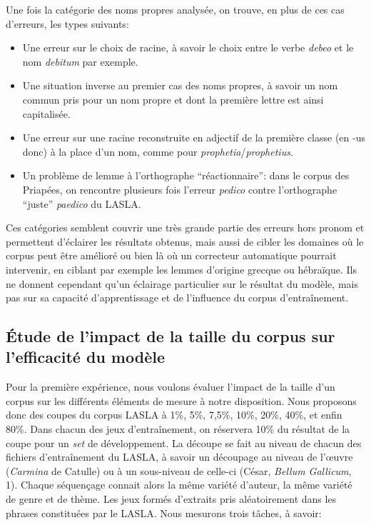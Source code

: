 Une fois la catégorie des noms propres analysée, on trouve, en plus de ces cas d'erreurs, les types suivants:
\begin{itemize}
    \item Une erreur sur le choix de racine, à savoir le choix entre le verbe \textit{debeo} et le nom \textit{debitum} par exemple.
    \item Une situation inverse au premier cas des noms propres, à savoir un nom commun pris pour un nom propre et dont la première lettre est ainsi capitalisée.
    \item Une erreur sur une racine reconstruite en adjectif de la première classe (en -us donc) à la place d'un nom, comme pour \textit{prophetia}/\textit{prophetius}.
    \item Un problème de lemme à l'orthographe \enquote{réactionnaire}: dans le corpus des Priapées, on rencontre plusieurs fois l'erreur \textit{pedico} contre l'orthographe \enquote{juste} \textit{paedico} du LASLA.
\end{itemize}

Ces catégories semblent couvrir une très grande partie des erreurs hors pronom et permettent d'éclairer les résultats obtenus, mais aussi de cibler les domaines où le corpus peut être amélioré ou bien là où un correcteur automatique pourrait intervenir, en ciblant par exemple les lemmes d'origine grecque ou hébraïque. Ils ne donnent cependant qu'un éclairage particulier sur le résultat du modèle, mais pas sur sa capacité d'apprentissage et de l'influence du corpus d'entraînement.

\subsection{Étude de l'impact de la taille du corpus sur l'efficacité du modèle}
\label{lemmatisation:extensibilite:tailles}

Pour la première expérience, nous voulons évaluer l'impact de la taille d'un corpus sur les différents éléments de mesure à notre disposition. Nous proposons donc des coupes du corpus LASLA à 1\%, 5\%, 7,5\%, 10\%, 20\%, 40\%, et enfin 80\%. Dans chacun des jeux d'entraînement, on réservera 10\% du résultat de la coupe pour un \textit{set} de développement. La découpe se fait au niveau de chacun des fichiers d'entraînement du LASLA, à savoir un découpage au niveau de l'œuvre (\textit{Carmina} de Catulle) ou à un sous-niveau de celle-ci (César, \textit{Bellum Gallicum}, 1). Chaque séquençage connait alors la même variété d'auteur, la même variété de genre et de thème. Les jeux formés d'extraits pris aléatoirement dans les phrases constituées par le LASLA. Nous mesurons trois tâches, à savoir:

